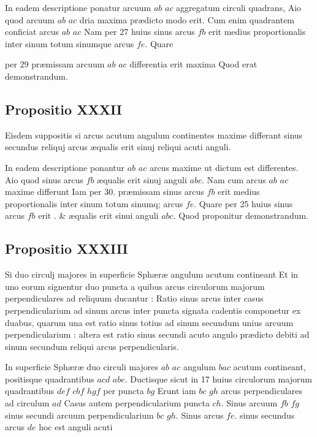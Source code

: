 \documentclass[11pt,a4paper]{article}
\begin{document}
In eadem descriptione ponatur arcuum $ab$ $ac$ aggregatum circuli quadrans, Aio quod arcuum $ab$ $ac$ dria maxima prædicto modo erit. Cum enim quadrantem conficiat arcus $ab$ $ac$ Nam per 27 huius sinus arcus $fb$ erit medius proportionalis inter sinum totum sinumque arcus $fe$. Quare

per 29 præmissam arcuum $ab$ $ac$ differentia erit maxima Quod erat demonstrandum.

\subsection*{Propositio XXXII}

Eisdem suppositis si arcus acutum angulum continentes maxime differant sinus secundus reliquj arcus æqualis erit sinuj reliqui acuti anguli.

In eadem descriptione ponantur $ab$ $ac$ arcus maxime ut dictum est differentes. Aio quod sinus arcus $fb$ æqualis erit sinuj anguli $abc$. Nam cum arcus $ab$ $ac$ maxime differunt Iam per 30. præmissam sinus arcus $fb$ erit medius proportionalis inter sinum totum sinumq; arcus $fe$. Quare per 25 huius sinus arcus $fb$ erit . \& æqualis erit sinui anguli $abc$. Quod proponitur demonstrandum.

\subsection*{Propositio XXXIII}

Si duo circulj majores in superficie Sphæræ angulum acutum contineant Et in uno eorum signentur duo puncta a quibus arcus circulorum majorum perpendiculares ad reliquum ducantur : Ratio sinus arcus inter casus perpendicularium ad sinum arcus inter puncta signata cadentis componetur ex duabus, quarum una est ratio sinus totius ad sinum secundum unius arcuum perpendicularium : altera est ratio sinus secundi acuto angulo prædicto debiti ad sinum secundum reliqui arcus perpendicularis.

In superficie Sphæræ duo circuli majores $ab$ $ac$ angulum $bac$ acutum contineant, positisque quadrantibus $acd$ $abe$. Ductisque sicut in 17 huius circulorum majorum quadrantibus $def$ $cbf$ $hgf$ per puncta  $bg$ Erunt iam $bc$ $gh$ arcus perpendiculares ad circulum $ad$ Casus autem perpendicularium puncta $ch$. Sinus arcuum $fb$ $fg$ sinus secundi arcuum perpendicularium $bc$ $gh$. Sinus arcus $fe$. sinus secundus arcus $de$ hoc est anguli acuti
\end{document}
